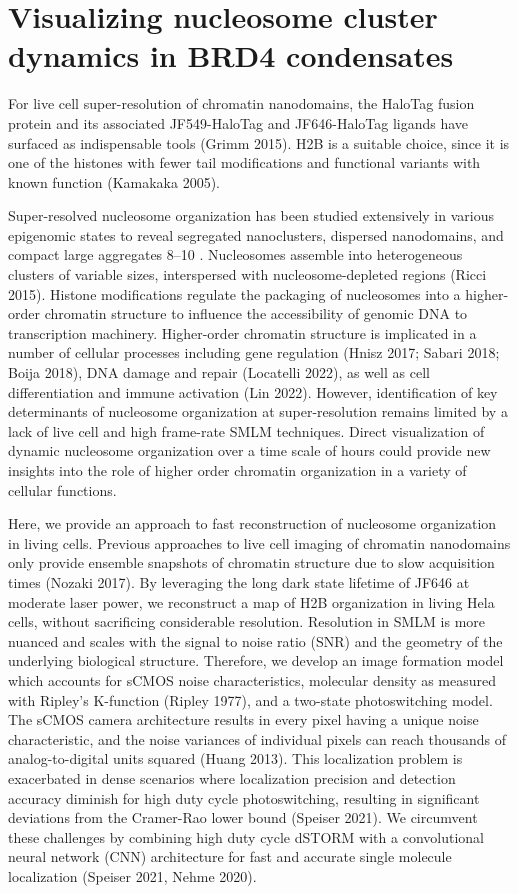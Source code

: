 \documentclass{ucetd}
\begin{document}
\section{Visualizing nucleosome cluster dynamics in BRD4 condensates}

For live cell super-resolution of chromatin nanodomains, the HaloTag fusion protein and its associated JF549-HaloTag and JF646-HaloTag ligands have surfaced as indispensable tools (Grimm 2015). H2B is a suitable choice, since it is one of the histones with fewer tail modifications and functional variants with known function (Kamakaka 2005).

Super-resolved nucleosome organization has been studied extensively in various epigenomic states to reveal segregated nanoclusters, dispersed nanodomains, and compact large aggregates  8–10 . Nucleosomes assemble into heterogeneous clusters of variable sizes, interspersed with nucleosome-depleted regions (Ricci 2015). Histone modiﬁcations regulate the packaging of nucleosomes into a higher-order chromatin structure to inﬂuence the accessibility of genomic DNA to transcription machinery. Higher-order chromatin structure is implicated in a number of cellular processes including gene regulation (Hnisz 2017; Sabari 2018; Boija 2018), DNA damage and repair (Locatelli 2022), as well as cell differentiation and immune activation (Lin 2022). However, identification of key determinants of nucleosome organization at super-resolution remains limited by a lack of live cell and high frame-rate SMLM techniques. Direct visualization of dynamic nucleosome organization over a time scale of hours could provide new insights into the role of higher order chromatin organization in a variety of cellular functions.  

Here, we provide an approach to fast reconstruction of nucleosome organization in living cells. Previous approaches to live cell imaging of chromatin nanodomains only provide ensemble snapshots of chromatin structure due to slow acquisition times (Nozaki 2017). By leveraging the long dark state lifetime of JF646 at moderate laser power, we reconstruct a map of H2B organization in living Hela cells, without sacrificing considerable resolution. Resolution in SMLM is more nuanced and scales with the signal to noise ratio (SNR) and the geometry of the underlying biological structure. Therefore, we develop an image formation model which accounts for sCMOS noise characteristics, molecular density as measured with Ripley’s K-function (Ripley 1977), and a two-state photoswitching model. The sCMOS camera architecture results in every pixel having a unique noise characteristic, and the noise variances of individual pixels can reach thousands of analog-to-digital units squared (Huang 2013). This localization problem is exacerbated in dense scenarios where localization precision and detection accuracy diminish for high duty cycle photoswitching, resulting in significant deviations from the Cramer-Rao lower bound (Speiser 2021). We circumvent these challenges by combining high duty cycle dSTORM with a convolutional neural network (CNN) architecture for fast and accurate single molecule localization (Speiser 2021, Nehme 2020). 
\end{document}
